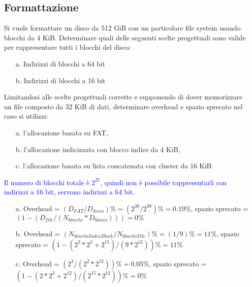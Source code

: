 \documentclass[12pt]{article}
\begin{document}
\subsection{Formattazione}
Si vuole formattare un disco da 512 GiB con un particolare file system usando blocchi da 4 KiB.
Determinare quali delle seguenti scelte progettuali sono valide per rappresentare tutti i blocchi del
disco:
\begin{itemize}
    \item [a.]Indirizzi di blocchi a 64 bit
    \item [b.]Indirizzi di blocchi a 16 bit
\end{itemize}
Limitandosi alle scelte progettuali corrette e supponendo di dover memorizzare un file composto da
32 KiB di dati, determinare overhead e spazio sprecato nel caso si utilizzi:
\begin{itemize}
    \item [a.]l'allocazione basata su FAT,
    \item [b.]l'allocazione indicizzata con blocco indice da 4 KiB,
    \item [c.]l'allocazione basata su lista concatenata con cluster da 16 KiB.
\end{itemize}
\textcolor{blue}{
    Il numero di blocchi totale è $2^{27}$, quindi non è possibile rappresentarli con indirizzi a 16 bit, servono indirizzi 
    a 64 bit.
}
\begin{itemize}
    \color{blue}
    \item [a.]Overhead = $(D_{FAT}/D_{disco})\%=(2^{30}/2^{39})\%=0.19\%$, spazio sprecato = $(1-(D_{file}/(N_{blocchi}*D_{blocco})))=0\%$
    \item [b.]Overhead = $(N_{blocchiIndexBlock}/N_{blocchiFile})\%=(1/9)\%=11\%$, spazio sprecato = $(1-(2^3*2^3+2^{15})/(9*2^{12}))\%=11\%$
    \item [c.]Overhead = $(2^3/(2^2*2^{12}))\%=0.05\%$, spazio sprecato = $(1-(2*2^3+2^{12})/(2^{15}*2^{12}))\%=0\%$
\end{itemize}
\end{document}

